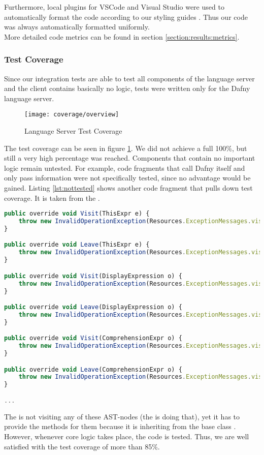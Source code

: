 Furthermore, local plugins for VSCode and Visual Studio were used to automatically
format the code according to our styling guides \cite{dev}.
Thus our code was always automatically formatted uniformly. \\

More detailed code metrics can be found in section \ref{section:results:metrics}.

\pagebreak
\subsubsection{Test Coverage}
Since our integration tests are able to test all components of the language server
and the client contains basically no logic,
tests were written only for the Dafny language server.

\begin{figure}[H]
    \centering
    \texttt{[image: coverage/overview]}
    \caption{Language Server Test Coverage}
    \label{fig:test_coverage}
\end{figure}

The test coverage can be seen in figure \ref{fig:test_coverage}.
We did not achieve a full 100\%, but still a very high percentage was reached.
Components that contain no important logic remain untested.
For example, code fragments that call Dafny itself and only pass information were not specifically tested, since no advantage would be gained.
Listing \ref{lst:nottested} shows another code fragment that pulls down test coverage.
It is taken from the .

\begin{lstlisting}[language=typescript, caption={Untested Code}, captionpos=b, label={lst:nottested}]
public override void Visit(ThisExpr e) {
    throw new InvalidOperationException(Resources.ExceptionMessages.visit_only_declarations);
}

public override void Leave(ThisExpr e) {
    throw new InvalidOperationException(Resources.ExceptionMessages.visit_only_declarations);
}

public override void Visit(DisplayExpression o) {
    throw new InvalidOperationException(Resources.ExceptionMessages.visit_only_declarations);
}

public override void Leave(DisplayExpression o) {
    throw new InvalidOperationException(Resources.ExceptionMessages.visit_only_declarations);
}

public override void Visit(ComprehensionExpr o) {
    throw new InvalidOperationException(Resources.ExceptionMessages.visit_only_declarations);
}

public override void Leave(ComprehensionExpr o) {
    throw new InvalidOperationException(Resources.ExceptionMessages.visit_only_declarations);
}

...
\end{lstlisting}

The  is not visiting any of these AST-nodes (the  is doing that),
yet it has to provide the methods for them because it is inheriting from the base class .
However, whenever core logic takes place, the code is tested.
Thus, we are well satisfied with the test coverage of more than 85\%.
